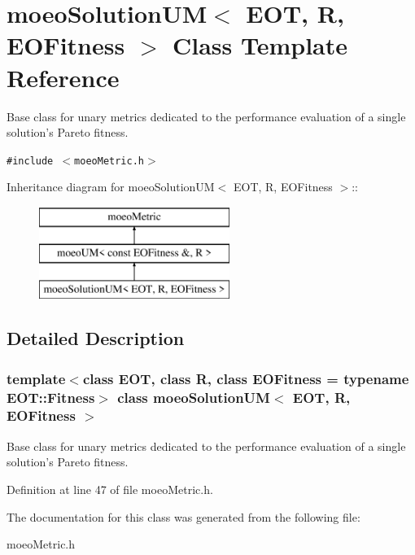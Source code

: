 \section{moeo\-Solution\-UM$<$ EOT, R, EOFitness $>$ Class Template Reference}
\label{classmoeoSolutionUM}
Base class for unary metrics dedicated to the performance evaluation of a single solution's Pareto fitness.  


{\tt \#include $<$moeo\-Metric.h$>$}

Inheritance diagram for moeo\-Solution\-UM$<$ EOT, R, EOFitness $>$::\begin{figure}[H]
\begin{center}
\leavevmode
\includegraphics[height=3cm]{classmoeoSolutionUM}
\end{center}
\end{figure}


\subsection{Detailed Description}
\subsubsection*{template$<$class EOT, class R, class EOFitness = typename EOT::Fitness$>$ class moeo\-Solution\-UM$<$ EOT, R, EOFitness $>$}

Base class for unary metrics dedicated to the performance evaluation of a single solution's Pareto fitness. 



Definition at line 47 of file moeo\-Metric.h.

The documentation for this class was generated from the following file:\begin{CompactItemize}
\item 
moeo\-Metric.h\end{CompactItemize}
